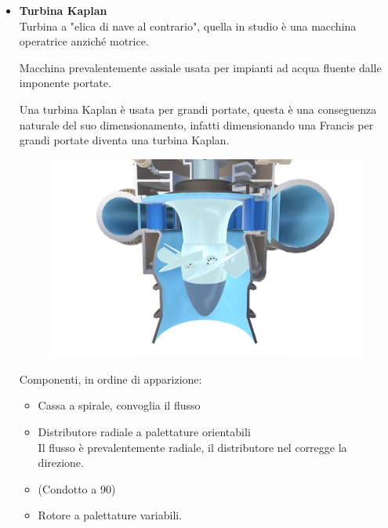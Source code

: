 \documentclass[a4paper, 15pt]{article}
\begin{document}
\begin{adjustwidth}{2in}{}
\begin{itemize}
		\item \textbf{Turbina Kaplan}\\
		Turbina a "elica di nave al contrario", quella in studio è una macchina operatrice anziché motrice. 
		
		Macchina prevalentemente assiale usata per impianti ad acqua fluente dalle imponente portate. 
		
		Una turbina Kaplan è usata per grandi portate, questa è una conseguenza naturale del suo dimensionamento, infatti dimensionando una Francis per grandi portate diventa una turbina Kaplan. 
		\begin{figure}[H]
			\centering
			\includegraphics[width=0.4\linewidth]{immagini/turbinakaplan2}
			\label{fig:turbinakaplan2}
		\end{figure}		
		Componenti, in ordine di apparizione: 
		\begin{itemize}
			\item Cassa a spirale, convoglia il flusso
			\item Distributore radiale a palettature orientabili \\ Il flusso è prevalentemente radiale, il distributore nel corregge la direzione. 
			\item (Condotto a 90\degree)
			\item Rotore a palettature variabili. 			
		\end{itemize}		
	\end{itemize}
\end{adjustwidth}
\end{document}
